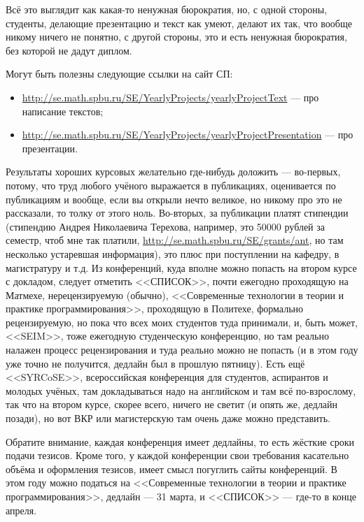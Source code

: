 \documentclass[a5paper]{article}
\begin{document}
Всё это выглядит как какая-то ненужная бюрократия, но, с одной стороны, студенты, делающие презентацию и текст как умеют, делают их так, что вообще никому ничего не понятно, с другой стороны, это и есть ненужная бюрократия, без которой не дадут диплом.

Могут быть полезны следующие ссылки на сайт СП: 
\begin{itemize}
	\item \url{http://se.math.spbu.ru/SE/YearlyProjects/yearlyProjectText} --- про написание текстов;
	\item \url{http://se.math.spbu.ru/SE/YearlyProjects/yearlyProjectPresentation} --- про презентации.
\end{itemize}

Результаты хороших курсовых желательно где-нибудь доложить --- во-первых, потому, что труд любого учёного выражается в публикациях, оценивается по публикациям и вообще, если вы открыли нечто великое, но никому про это не рассказали, то толку от этого ноль. Во-вторых, за публикации платят стипендии (стипендию Андрея Николаевича Терехова, например, это 50000 рублей за семестр, чтоб мне так платили, \url{http://se.math.spbu.ru/SE/grants/ant}, но там несколько устаревшая информация), это плюс при поступлении на кафедру, в магистратуру и т.д. Из конференций, куда вполне можно попасть на втором курсе с докладом, следует отметить <<СПИСОК>>, почти ежегодно проходящую на Матмехе, нерецензируемую (обычно), <<Современные технологии в теории и практике программирования>>, проходящую в Политехе, формально рецензируемую, но пока что всех моих студентов туда принимали, и, быть может, <<SEIM>>, тоже ежегодную студенческую конференцию, но там реально налажен процесс рецензирования и туда реально можно не попасть (и в этом году уже точно не получится, дедлайн был в прошлую пятницу). Есть ещё <<SYRCoSE>>, всероссийская конференция для студентов, аспирантов и молодых учёных, там докладываться надо на английском и там всё по-взрослому, так что на втором курсе, скорее всего, ничего не светит (и опять же, дедлайн позади), но вот ВКР или магистерскую там очень даже можно представить. 

Обратите внимание, каждая конференция имеет дедлайны, то есть жёсткие сроки подачи тезисов. Кроме того, у каждой конференции свои требования касательно объёма и оформления тезисов, имеет смысл погуглить сайты конференций. В этом году можно податься на <<Современные технологии в теории и практике программирования>>, дедлайн --- 31 марта, и <<СПИСОК>> --- где-то в конце апреля.
\end{document}
